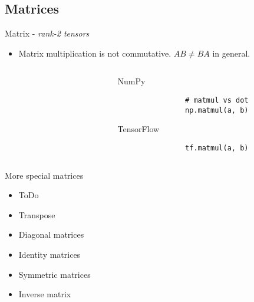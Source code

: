 \documentclass[handout]{beamer}
\begin{document}
\subsection{Matrices}
\begin{frame}[fragile]{Matrix - \textit{rank-2 tensors}}
    \begin{itemize}
        \item Matrix multiplication is not commutative. $AB \neq BA$ in general.
    \end{itemize}
    \begin{columns}
        \begin{column}{0.5\textwidth}
            \begin{figure}[htb]
                \centering
                \resizebox{5cm}{6cm}{
                    
                }
                \label{fig:matmul}
            \end{figure}
        \end{column}
        \begin{column}{0.5\textwidth}
            \begin{alertblock}{NumPy}
                \begin{lstlisting}
                # matmul vs dot
                np.matmul(a, b)
                \end{lstlisting}
            \end{alertblock}
            \begin{alertblock}{TensorFlow}
                \begin{lstlisting}
                tf.matmul(a, b)
                \end{lstlisting}
            \end{alertblock}
        \end{column}
    \end{columns}
\end{frame}


\begin{frame}[fragile]{More special matrices}
    \begin{itemize}
        \item ToDo
        \item Transpose
        \item Diagonal matrices
        \item Identity matrices
        \item Symmetric matrices %
        \item Inverse matrix
    \end{itemize}
\end{frame}
\end{document}
